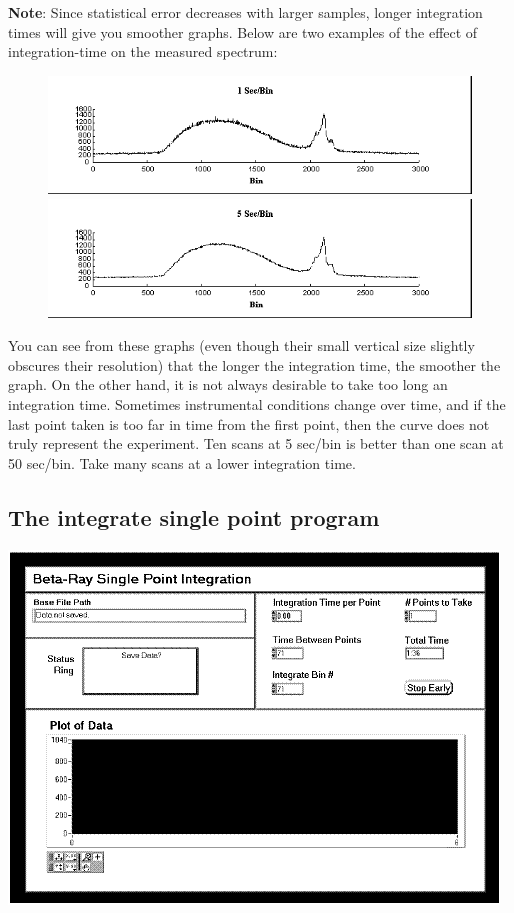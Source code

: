 \documentclass{../lab}
\begin{document}
\textbf{Note}: Since statistical error decreases with larger samples, longer integration times will give you smoother graphs. Below are two examples of the effect of integration-time on the measured spectrum:

\begin{figure}[h]
    \centering
    \href{http://experimentationlab.berkeley.edu/sites/default/files/images/BRAimage035.gif}{\includegraphics[width=0.7\linewidth]{images/BRAimage035.png}} \\
    \href{http://experimentationlab.berkeley.edu/sites/default/files/images/BRAimage036.gif}{\includegraphics[width=0.7\linewidth]{images/BRAimage036.png}}
\end{figure}

You can see from these graphs (even though their small vertical size slightly obscures their resolution) that the longer the integration time, the smoother the graph. On the other hand, it is not always desirable to take too long an integration time. Sometimes instrumental conditions change over time, and if the last point taken is too far in time from the first point, then the curve does not truly represent the experiment. Ten scans at 5 sec/bin is better than one scan at 50 sec/bin. Take many scans at a lower integration time.

\subsection{The integrate single point program}

\begin{center}
    \href{http://experimentationlab.berkeley.edu/sites/default/files/images/BRAimage037.gif}{\includegraphics[width=0.7\linewidth]{images/BRAimage037.png}}
\end{center}
\end{document}

